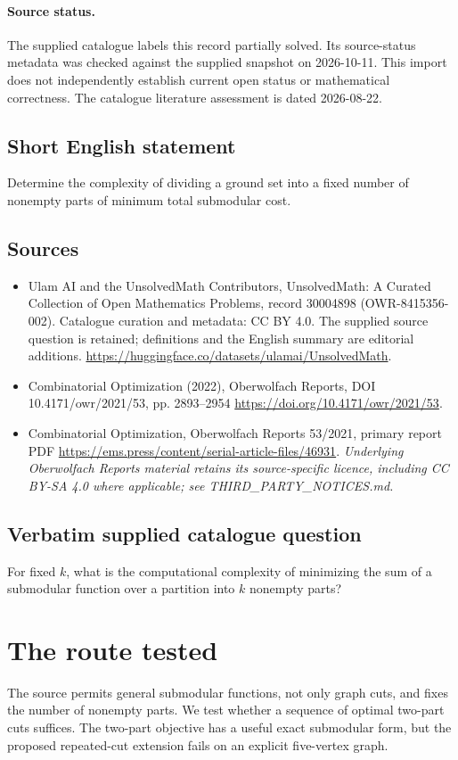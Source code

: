 \documentclass[11pt]{article}
\begin{document}
\paragraph{Source status.}
The supplied catalogue labels this record partially solved. Its source-status metadata was checked against the supplied snapshot on 2026-10-11. This import does not independently establish current open status or mathematical correctness. The catalogue literature assessment is dated 2026-08-22.
\subsection{Short English statement}
Determine the complexity of dividing a ground set into a fixed number of nonempty parts of minimum total submodular cost.
\subsection{Sources}
\begin{itemize}
\item[S1] Ulam AI and the UnsolvedMath Contributors, UnsolvedMath: A Curated Collection of Open Mathematics Problems, record 30004898 (OWR-8415356-002). Catalogue curation and metadata: CC BY 4.0. The supplied source question is retained; definitions and the English summary are editorial additions.
\url{https://huggingface.co/datasets/ulamai/UnsolvedMath}.
\item[S2] Combinatorial Optimization (2022), Oberwolfach Reports, DOI 10.4171/owr/2021/53, pp. 2893--2954
\url{https://doi.org/10.4171/owr/2021/53}.
\item[S3] Combinatorial Optimization, Oberwolfach Reports 53/2021, primary report PDF
\url{https://ems.press/content/serial-article-files/46931}.
\textit{Underlying Oberwolfach Reports material retains its source-specific licence, including CC BY-SA 4.0 where applicable; see THIRD\_PARTY\_NOTICES.md.}
\end{itemize}
\subsection{Verbatim supplied catalogue question}
For fixed $k$, what is the computational complexity of minimizing the sum of a submodular function over a partition into $k$ nonempty parts?

\section{The route tested}
The source permits general submodular functions, not only graph cuts,
and fixes the number of nonempty parts. We test whether a sequence
of optimal two-part cuts suffices. The two-part objective has a
useful exact submodular form, but the proposed repeated-cut extension
fails on an explicit five-vertex graph.
\end{document}
